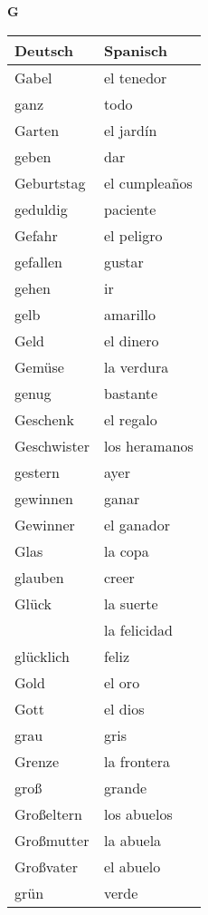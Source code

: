 \begin{flushright}\begin{Huge}\textbf{G}\end{Huge}\end{flushright}

\begin{longtable}{p{} p{}} 
\textbf{Deutsch}     & \textbf{Spanisch}                                       \\ \hline
\hline
\endhead %
Gabel & el tenedor\\
ganz & todo\\
Garten & el jardín\\
geben & dar\\
Geburtstag & el cumpleaños\\
geduldig & paciente\\
Gefahr & el peligro\\
gefallen & gustar\\
gehen & ir\\
gelb & amarillo \\
Geld & el dinero\\
Gemüse & la verdura\\
genug & bastante\\
Geschenk & el regalo\\
Geschwister & los heramanos \\
gestern & ayer\\
gewinnen & ganar\\
Gewinner & el ganador\\
Glas & la copa\\
glauben & creer\\
Glück & la suerte \\
~ & la felicidad \\
glücklich & feliz\\
Gold & el oro\\
Gott & el dios\\
grau & gris \\
Grenze & la frontera\\
groß & grande\\
Großeltern & los abuelos\\
Großmutter & la abuela\\
Großvater & el abuelo\\
grün & verde\\

\end{longtable}
